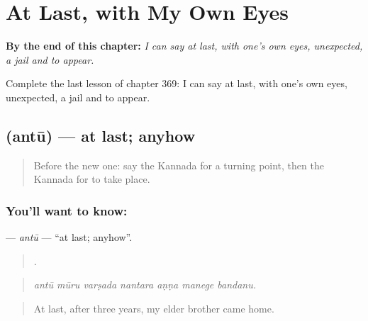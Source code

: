 
\chapter{At Last, with My Own Eyes}
\label{ch:ka-at-last-with-my-own-eyes}

\begin{chapteropening}
\textbf{By the end of this chapter:} \emph{I can say at last, with one's own eyes, unexpected, a jail and to appear.}

Complete the last lesson of chapter 369: I can say at last, with one's own eyes, unexpected, a jail and to appear.
\end{chapteropening}

\section[\texorpdfstring{\kn{ಅಂತೂ} (antū)}{ಅಂತೂ (antū)}]{ (antū) — at last; anyhow}

\label{lesson:KA-C369-antu}



\begin{quote}
Before the new one: say the Kannada for a turning point, then the Kannada for to take place.
\end{quote}

\subsection*{You'll want to know: }
\textbf{} — \emph{antū} — \textquotedblleft{}at last; anyhow\textquotedblright{}.

\begin{quote}
      .
\end{quote}

\begin{quote}
\emph{antū mūru varṣada nantara aṇṇa manege bandanu.}
\end{quote}

\begin{quote}
At last, after three years, my elder brother came home.
\end{quote}


